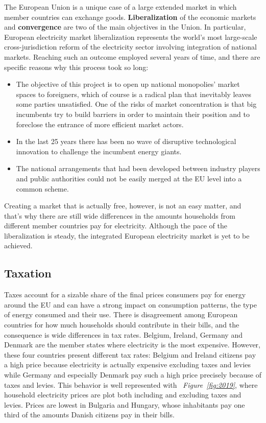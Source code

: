 \documentclass[a4paper,12pt]{book}
\begin{document}
The European Union is a unique case of a large extended market in which member countries can exchange goods.  \textbf{Liberalization} of the economic markets and \textbf{convergence} are two of the main objectives in the Union. In particular, European electricity market liberalization represents the world's most large-scale cross-jurisdiction reform of the electricity sector involving integration of national markets. Reaching such an outcome employed several years of time, and there are specific reasons why this process took so long:

\begin{itemize}

\item The objective of this project is to open up national monopolies’ market spaces to foreigners, which of course is a radical
plan that inevitably leaves some parties unsatisfied.  One of the risks of market concentration is that big incumbents try to build
barriers in order to maintain their position and to foreclose the entrance of more efficient market actors.~\cite{ringel2003liberalising}

\item In the last 25 years there has been no wave of disruptive technological innovation to challenge the incumbent energy
giants.

\item The national arrangements that had been developed between industry players and public authorities could not be easily merged at the EU level into a common scheme.
\end{itemize}

Creating a market that is actually free, however, is not an easy matter, and that's why there are still wide differences in the amounts households from different member countries pay for electricity. Although the pace of the liberalization is steady, the integrated European electricity market is yet to be achieved. \\

\subsection{Taxation}

Taxes account for a sizable share of the final prices consumers pay for energy around the EU and can have a strong impact on consumption patterns, the type of energy consumed and their use. There is disagreement among European countries for how much households should contribute in their bills, and the consequence is wide differences in tax rates. Belgium, Ireland, Germany and Denmark are the member states where electricity is the most expensive. However, these four countries present different tax rates: Belgium and Ireland citizens pay a high price because electricity is actually expensive excluding taxes and levies while Germany and especially Denmark pay such a high price precisely because of taxes and levies. This behavior is well represented with ~\textit{Figure~\ref{fig:2019}}, where household electricity prices are plot both including and excluding taxes and levies. Prices are lowest in Bulgaria and Hungary, whose inhabitants pay one third of the amounts Danish citizens pay in their bills. 
\end{document}
